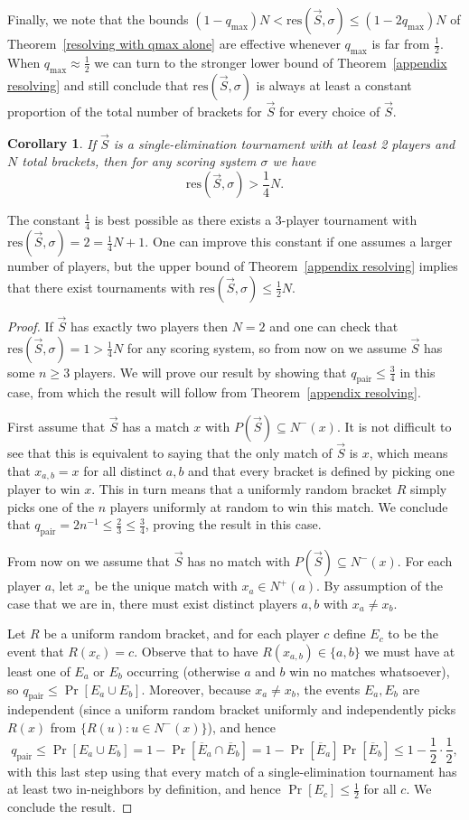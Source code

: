 \documentclass[12pt,letterpaper]{article}
\newtheorem{cor}[thm]{Corollary}
\theoremstyle{definition}
\newcommand{\sig}{\sigma}
\newcommand{\half}{\frac{1}{2}}
\newcommand{\quart}{\frac{1}{4}}
\renewcommand{\1}{\mathbbm{1}}
\newcommand{\sub}{\subseteq}
\newcommand{\tour}{\vec{S}}
\newcommand{\res}{\mathrm{res}}
\begin{document}
Finally, we note that the bounds $(1-q_{\max})N<\res(\tour,\sig)\le (1-2q_{\max})N$ of Theorem~\ref{resolving with qmax alone} are effective whenever $q_{\max}$ is far from $\half$.  When $q_{\max}\approx \half$ we can turn to the stronger lower bound of Theorem~\ref{appendix resolving} and still conclude that  $\res(\tour,\sig)$ is always at least a constant proportion of the total number of brackets for $\tour$ for every choice of $\tour$.

\begin{cor}\label{resolving quarter bound}
	If $\tour$ is a single-elimination tournament with at least 2 players and $N$ total brackets, then for any scoring system $\sig$ we have
	\[\res(\tour,\sig)> \quart N.\]
\end{cor}
The constant $\quart$ is best possible as there exists a 3-player tournament with $\res(\tour,\sig)=2=\quart N+1$.  One can improve this constant if one assumes a larger number of players, but the upper bound of Theorem~\ref{appendix resolving} implies that there exist tournaments with $\res(\tour,\sig)\le \half N$. 

\begin{proof}
	If $\tour$ has exactly two players then $N=2$ and one can check that $\res(\tour,\sig)=1> \quart N$ for any scoring system, so from now on we assume $\tour$ has some $n\ge 3$ players.  We will prove our result by showing that $q_{\mathrm{pair}}\le \frac{3}{4}$ in this case, from which the result will follow from Theorem~\ref{appendix resolving}.
	
	First assume that $\tour$ has a match $x$ with $P(\tour)\sub N^-(x)$.  It is not difficult to see that this is equivalent to saying that the only match of $\tour$ is $x$, which means that $x_{a,b}=x$ for all distinct $a,b$ and that every bracket is defined by picking one player to win $x$.  This in turn means that a uniformly random bracket $R$ simply picks one of the $n$ players uniformly at random to win this match.  We conclude that $q_{\mathrm{pair}}=2n^{-1}\le \frac{2}{3}\le \frac{3}{4}$, proving the result in this case.
	
	From now on we assume that $\tour$ has no match with $P(\tour)\sub N^-(x)$.  For each player $a$, let $x_a$ be the unique match with $x_a\in N^+(a)$.    By assumption of the case that we are in, there must exist distinct players $a,b$ with $x_a\ne x_b$.
	
	Let $R$ be a uniform random bracket, and for each player $c$ define $E_c$ to be the event that $R(x_c)=c$.  Observe that to have $R(x_{a,b})\in \{a,b\}$ we must have at least one of $E_a$ or $E_b$ occurring (otherwise $a$ and $b$ win no matches whatsoever), so $q_{\mathrm{pair}}\le \Pr[E_a\cup E_b]$.  Moreover, because $x_a\ne x_b$, the events $E_a,E_b$ are independent (since a uniform random bracket uniformly and independently picks $R(x)$ from $\{R(u):u\in N^-(x)\}$), and hence  
	\[q_{\mathrm{pair}}\le \Pr[E_a\cup E_b]=1-\Pr[\overline{E}_a\cap \overline{E}_b]=1-\Pr[\overline{E}_a]\Pr[\overline{E}_b]\le 1-\half\cdot \half, \]
	with this last step using that every match of a single-elimination tournament has at least two in-neighbors by definition, and hence $\Pr[E_c]\le \half $ for all $c$. We conclude the result.
\end{proof} 
\end{document}
